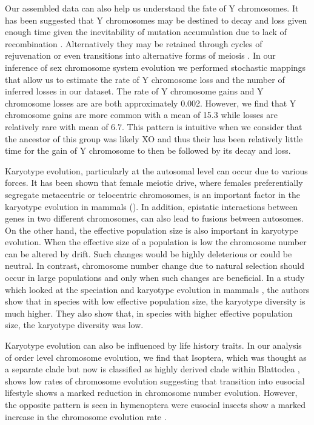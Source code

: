 Our assembled data can also help us understand the fate of Y chromosomes. 
It has been suggested that Y chromosomes may be destined to decay and loss given enough time given the inevitability of mutation accumulation due to lack of recombination \citep{steinemann2005}.
Alternatively they may be retained through cycles of rejuvenation or even transitions into alternative forms of meiosis \citep{blackmon2015bioessay}.
In our inference of sex chromosome system evolution we performed stochastic mappings that allow us to estimate the rate of Y chromosome loss and the number of inferred losses in our dataset.
The rate of Y chromosome gains and Y chromosome losses are are both approximately 0.002.%
However, we find that Y chromosome gains are more common with a mean of 15.3 while losses are relatively rare with mean of 6.7.
This pattern is intuitive when we consider that the ancestor of this group was likely XO and thus their has been relatively little time for the gain of Y chromosome to then be followed by its decay and loss.%

Karyotype evolution, particularly at the autosomal level can occur due to various forces.
It has been shown that female meiotic drive, where females preferentially segregate metacentric or telocentric chromosomes, is an important factor in the karyotype evolution in mammals (\citep{de2001female, blackmon2019meiotic}).
In addition, epistatic interactions between genes in two different chromosomes, can also lead to fusions between autosomes. 
On the other hand, the effective population size is also important in karyotype evolution.
When the effective size of a population is low the chromosome number can be altered by drift. 
Such changes would be highly deleterious or could be neutral. 
In contrast, chromosome number change due to natural selection should occur in large populations and only when such changes are beneficial.
In a study which looked at the speciation and karyotype evolution in mammals \citep{bush1977rapid}, the authors show that in species with low effective population size, the karyotype diversity is much higher.
They also show that, in species with higher effective population size, the karyotype diversity was low.

Karyotype evolution can also be influenced by life history traits. 
In our analysis of order level chromosome evolution, we find that Isoptera, which was thought as a separate clade but now is classified as highly derived clade within Blattodea , shows low rates of chromosome evolution suggesting that transition into eusocial lifestyle shows a marked reduction in chromosome number evolution.
However, the opposite pattern is seen in hymenoptera were eusocial insects show a marked increase in the chromosome evolution rate \citep{ross2015}.

